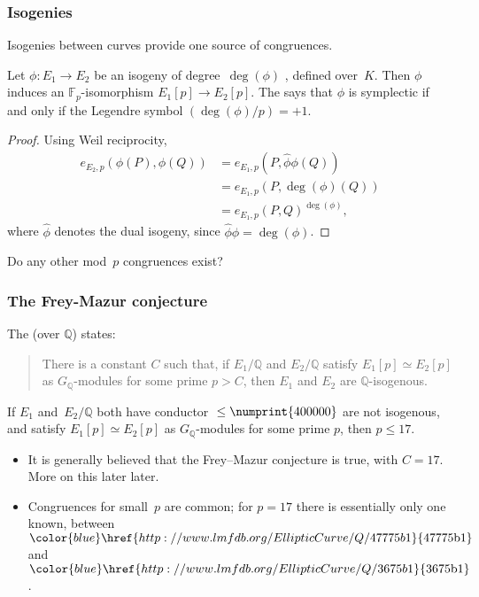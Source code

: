 \documentclass[compress]{beamer}
\newcommand{\Q}{\mathbb Q}
\newcommand{\F}{\mathbb F}
\newcommand{\lmfdbec}[3]{\color{blue}\href{http://www.lmfdb.org/EllipticCurve/Q/#1#2#3}{{\text{\rm#1#2#3}}}}
\newcommand{\high}[1]{\emph{\color{blue}{#1}}}
\begin{document}
\begin{frame}\frametitle{Isogenies}
  Isogenies between curves provide one source of congruences.
  \pause\medskip

  Let $\phi:E_1\to E_2$ be an isogeny of degree~$\deg(\phi)$
  \high{coprime to $p$}, defined over~$K$.  Then $\phi$ induces an
  $\F_p$-isomorphism $E_1[p]\to E_2[p]$.  The \high{isogeny criterion}
  says that $\phi$ is symplectic if and only if the Legendre symbol
  $({\deg(\phi)}/{p})=+1$.
  \pause\medskip

  \begin{proof}
    Using Weil reciprocity,
    \[
    \begin{aligned}
      e_{E_2,p}(\phi(P), \phi(Q)) &= e_{E_1,p}(P, \hat\phi\phi(Q)) \\
      &= e_{E_1,p}(P, \deg(\phi)(Q))\\ &= e_{E_1,p}(P,
      Q)^{\deg(\phi)},
    \end{aligned}
  \]
  where $\hat{\phi}$ denotes the dual isogeny, since $\hat\phi\phi=\deg(\phi)$.
  \end{proof}
  \pause\medskip

  Do any other mod~$p$ congruences exist?
\end{frame}

\begin{frame}\frametitle{The Frey-Mazur conjecture}
  The \high{Frey--Mazur conjecture} (over $\Q$) states:

  \begin{quote}There is a constant $C$ such that, if $E_1/\Q$ and $E_2/\Q$
  satisfy $E_1[p] \simeq E_2[p]$ as $G_\Q$-modules for some prime $p >
  C$, then $E_1$ and $E_2$ are $\Q$-isogenous.
  \end{quote}

  \pause\medskip

  \begin{theorem}[C. \& Freitas]
  If $E_1$ and~$E_2/\Q$ both have conductor ${}\le\numprint{400000}$
  are not isogenous, and satisfy $E_1[p] \simeq E_2[p]$ as
  $G_\Q$-modules for some prime $p$, then $p\le17$.
  \end{theorem}

  \pause\medskip
  \begin{itemize}
    \item It is generally believed that the Frey--Mazur
      conjecture is true, with $C=17$. More on this later later.
      \item Congruences for small~$p$ are common; for $p=17$ there is
        essentially only one known, between $\lmfdbec{47775}{b}{1}$
        and~$\lmfdbec{3675}{b}{1}$.
  \end{itemize}

\end{frame}
\end{document}
